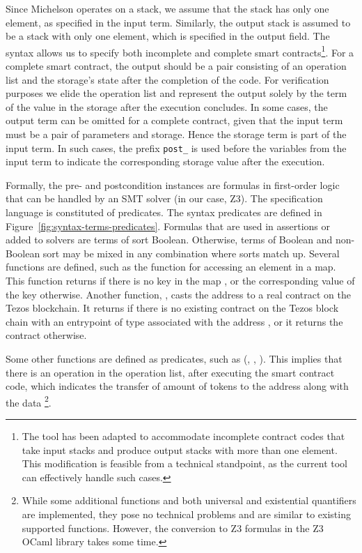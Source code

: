 \documentclass[a4paper,USenglish,cleveref, autoref, thm-restate]{lipics-v2021}
\begin{document}
Since Michelson operates on a stack, we assume that the stack has only one
element, as specified in the input term. Similarly, the output
stack is assumed to be a stack with only one element, which is
specified in the output field. The syntax allows us to specify both
incomplete and complete smart contracts\footnote{The tool has been adapted to accommodate incomplete contract codes that take input stacks and produce output stacks with more than one element. This modification is feasible from a technical standpoint, as the current tool can effectively handle such cases.}. For a complete smart contract, the output should be a pair consisting of an operation list and the storage's state after the completion of the code.  For verification purposes we elide the operation list and represent the output solely by the term of the value in the storage after the execution concludes. In some cases, the output term can be omitted for a complete contract, given that the input term must be a pair
of parameters and storage. Hence the storage term is part of the
input term. In such cases, the prefix \lstinline/post_/ is used
before the variables from the input term to indicate the corresponding
storage value after the execution.

Formally, the pre- and postcondition instances are formulas in first-order logic that can be handled by an SMT solver (in our case, Z3). The specification language is constituted of predicates.  The syntax predicates are defined in Figure~\ref{fig:syntax-terms-predicates}. Formulas that are used in assertions or added to solvers are terms of sort Boolean. Otherwise, terms of
Boolean and non-Boolean sort may be mixed in any combination where
sorts match up. Several functions are defined, such as the function  for accessing an element in a map. This function returns  if there is no key  in the map , or the corresponding value of the key otherwise. Another function, , casts the address  to a real contract on the Tezos blockchain. It returns  if there is no existing contract on the Tezos block chain with an entrypoint of type  associated with the address , or it returns the contract otherwise.

Some other functions are defined as predicates, such as  (, , ). This implies that there is an operation in the operation list, after executing the smart contract code, which indicates the transfer of  amount of tokens to the address  along with the data \footnote{While some additional functions and both universal and existential quantifiers are implemented, they pose no technical problems and are similar to existing supported functions. However, the conversion to Z3 formulas in the Z3 OCaml library takes some time.}.
\end{document}

